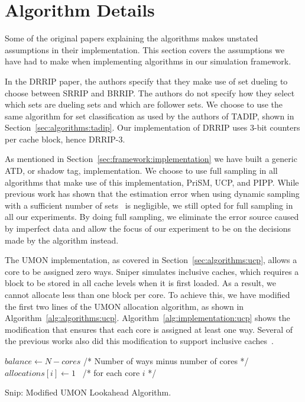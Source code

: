 \section{Algorithm Details}
\label{sec:framework:algorithms}

Some of the original papers explaining the algorithms makes unstated assumptions in their implementation.
This section covers the assumptions we have had to make when implementing algorithms in our simulation framework.

In the DRRIP paper, the authors specify that they make use of set dueling to choose between SRRIP and BRRIP.
The authors do not specify how they select which sets are dueling sets and which are follower sets.
We choose to use the same algorithm for set classification as used by the authors of TADIP, shown in Section~\ref{sec:algorithms:tadip}.
Our implementation of DRRIP uses 3-bit counters per cache block, hence DRRIP-3.

As mentioned in Section~\ref{sec:framework:implementation} we have built a generic ATD, or shadow tag, implementation.
We choose to use full sampling in all algorithms that make use of this implementation, PriSM, UCP, and PIPP.
While previous work has shown that the estimation error when using dynamic sampling with a sufficient number of sets~\cite{Jaleel2008} is negligible, we still opted for full sampling in all our experiments.
By doing full sampling, we eliminate the error source caused by imperfect data and allow the focus of our experiment to be on the decisions made by the algorithm instead.

The UMON implementation, as covered in Section~\ref{sec:algorithms:ucp}, allows a core to be assigned zero ways.
Sniper simulates inclusive caches, which requires a block to be stored in all cache levels when it is first loaded.
As a result, we cannot allocate less than one block per core.
To achieve this, we have modified the first two lines of the UMON allocation algorithm, as shown in Algorithm~\ref{alg:algorithms:ucp}.
Algorithm~\ref{alg:implementation:ucp} shows the modification that ensures that each core is assigned at least one way.
Several of the previous works also did this modification to support inclusive caches~\cite{Qureshi2006,Xie2009}.

\begin{algorithm}[ht]
\begin{algorithmic}[1]
\State $balance\gets N - cores $ /* Number of ways minus number of cores */
\State $allocations[i]\gets 1$  /* for each core $i$ */
\end{algorithmic}
\caption{Snip: Modified UMON Lookahead Algorithm.}
\label{alg:implementation:ucp}
\end{algorithm}

